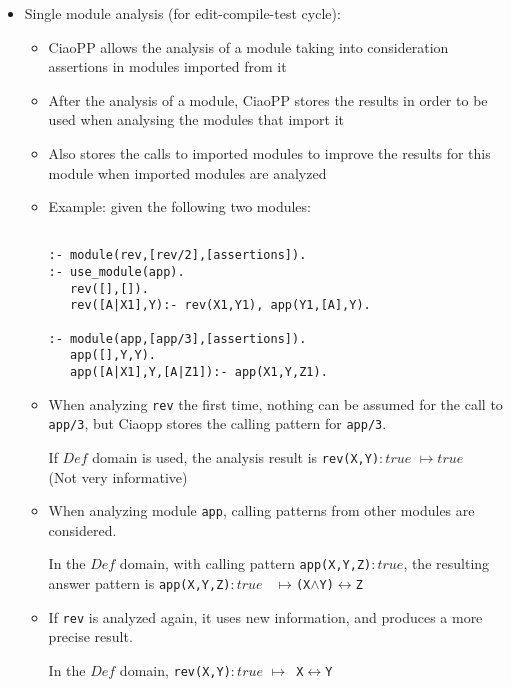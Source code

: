 \documentclass{article}
\renewcommand{\_}{\char'137}
\begin{document}
\begin{itemize}
\item Single module analysis (for edit-compile-test cycle):

  \begin{itemize}
  \item CiaoPP allows the analysis of a module taking into
    consideration assertions in modules imported from it

  \item After the analysis of a module, CiaoPP stores the results in
    order to be used when analysing the modules that import it

  \item Also stores the calls to imported modules to improve the
    results for this module when imported modules are analyzed

  \item Example: given the following two modules:

\begin{verbatim}

:- module(rev,[rev/2],[assertions]).
:- use_module(app).
   rev([],[]).
   rev([A|X1],Y):- rev(X1,Y1), app(Y1,[A],Y).

:- module(app,[app/3],[assertions]).
   app([],Y,Y).
   app([A|X1],Y,[A|Z1]):- app(X1,Y,Z1).

\end{verbatim}

  \item When analyzing \verb+rev+ the first time, nothing can be
    assumed for the call to \verb+app/3+, but Ciaopp stores the
    calling pattern for \verb+app/3+.

    If $Def$ domain is used, the analysis result is  \verb+rev(X,Y)+$:true$ $\mapsto true$ \\
  (Not very informative)

  \item When analyzing module \verb+app+, calling patterns from other
    modules are considered.
    
    In the $Def$ domain, with calling pattern
    \verb+app(X,Y,Z)+$:true$, the resulting answer pattern is
    \verb+app(X,Y,Z)+$:true$ {\tt
      $\mapsto$(X$\wedge$Y)$\leftrightarrow$Z}

  \item If \verb+rev+ is analyzed again, it uses new information, and
    produces a more precise result.

    In the $Def$ domain,  \verb+rev(X,Y)+$:true$
    {\tt $\mapsto$ X$\leftrightarrow$Y}
  \end{itemize}



\end{itemize}
\end{document}
